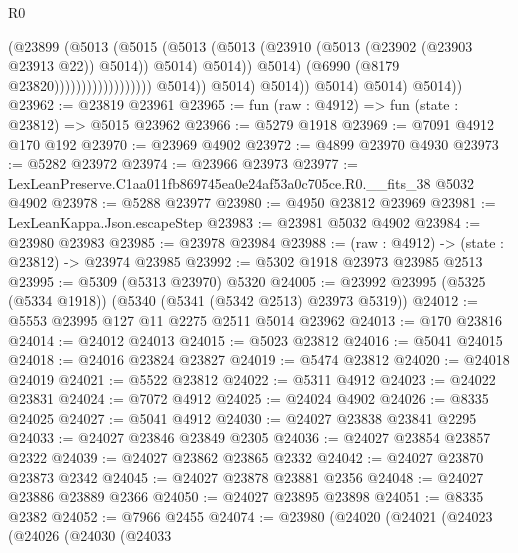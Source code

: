 \begin{lexlean}{R0}
\begin{coremodule}
                                                    (@23899
                                                      (@5013
                                                        (@5015
                                                          (@5013
                                                            (@5013
                                                              (@23910
                                                                (@5013
                                                                  (@23902 (@23903 @23913 @22))
                                                                  @5014))
                                                              @5014)
                                                            @5014))
                                                        @5014)
                                                      (@6990 (@8179 @23820))))))))))))))))))
                      @5014))
                  @5014)
                @5014))
            @5014)
          @5014)
        @5014))
@23962 := @23819 @23961
@23965 := fun (raw : @4912) => fun (state : @23812) => @5015 @23962
@23966 := @5279 @1918
@23969 := @7091 @4912 @170 @192
@23970 := @23969 @4902
@23972 := @4899 @23970 @4930
@23973 := @5282 @23972
@23974 := @23966 @23973
@23977 := LexLeanPreserve.C1aa011fb869745ea0e24af53a0c705ce.R0.__fits_38 @5032 @4902
@23978 := @5288 @23977
@23980 := @4950 @23812 @23969
@23981 := LexLeanKappa.Json.escapeStep
@23983 := @23981 @5032 @4902
@23984 := @23980 @23983
@23985 := @23978 @23984
@23988 := (raw : @4912) -> (state : @23812) -> @23974 @23985
@23992 := @5302 @1918 @23973 @23985 @2513
@23995 := @5309 (@5313 @23970) @5320
@24005 := @23992 @23995 (@5325 (@5334 @1918)) (@5340 (@5341 (@5342 @2513) @23973 @5319))
@24012 := @5553 @23995 @127 @11 @2275 @2511 @5014 @23962
@24013 := @170 @23816
@24014 := @24012 @24013
@24015 := @5023 @23812
@24016 := @5041 @24015
@24018 := @24016 @23824 @23827
@24019 := @5474 @23812
@24020 := @24018 @24019
@24021 := @5522 @23812
@24022 := @5311 @4912
@24023 := @24022 @23831
@24024 := @7072 @4912
@24025 := @24024 @4902
@24026 := @8335 @24025
@24027 := @5041 @4912
@24030 := @24027 @23838 @23841 @2295
@24033 := @24027 @23846 @23849 @2305
@24036 := @24027 @23854 @23857 @2322
@24039 := @24027 @23862 @23865 @2332
@24042 := @24027 @23870 @23873 @2342
@24045 := @24027 @23878 @23881 @2356
@24048 := @24027 @23886 @23889 @2366
@24050 := @24027 @23895 @23898
@24051 := @8335 @2382
@24052 := @7966 @2455
@24074 := @23980
    (@24020
      (@24021
        (@24023
          (@24026
            (@24030
              (@24033

\end{coremodule}
\end{lexlean}
